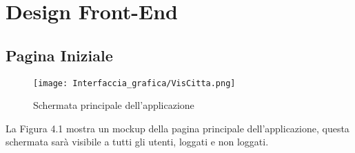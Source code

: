 \chapter{Design Front-End}


\section{Pagina Iniziale}

    \label{fig:4.1}
    \begin{figure}[H]
        \center
        \texttt{[image: Interfaccia\_grafica/VisCitta.png]}
        \caption{Schermata principale dell'applicazione}
    \end{figure}

    La Figura 4.1 mostra un mockup della pagina principale dell'applicazione, questa schermata sarà visibile a tutti gli utenti, loggati e non loggati.


